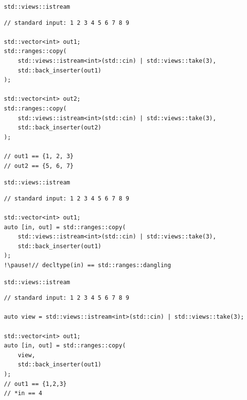 \documentclass[aspectratio=169]{beamer}
\begin{document}
\begin{frame}[fragile,c]{\texttt{std::views::istream}}
\small
\begin{center}
\begin{verbatim}
// standard input: 1 2 3 4 5 6 7 8 9

std::vector<int> out1;
std::ranges::copy(
    std::views::istream<int>(std::cin) | std::views::take(3),
    std::back_inserter(out1)
);

std::vector<int> out2;
std::ranges::copy(
    std::views::istream<int>(std::cin) | std::views::take(3),
    std::back_inserter(out2)
);

// out1 == {1, 2, 3}
// out2 == {5, 6, 7}
\end{verbatim}
\end{center}
\let\thefootnote\relax{}
\end{frame}

\begin{frame}[fragile,c]{\texttt{std::views::istream}}
\small
\begin{center}
\begin{verbatim}
// standard input: 1 2 3 4 5 6 7 8 9

std::vector<int> out1;
auto [in, out] = std::ranges::copy(
    std::views::istream<int>(std::cin) | std::views::take(3),
    std::back_inserter(out1)
);
!\pause!// decltype(in) == std::ranges::dangling
\end{verbatim}
\end{center}
\let\thefootnote\relax{}
\end{frame}

\begin{frame}[fragile,c]{\texttt{std::views::istream}}
\small
\begin{center}
\begin{verbatim}
// standard input: 1 2 3 4 5 6 7 8 9

auto view = std::views::istream<int>(std::cin) | std::views::take(3);

std::vector<int> out1;
auto [in, out] = std::ranges::copy(
    view,
    std::back_inserter(out1)
);
// out1 == {1,2,3}
// *in == 4
\end{verbatim}
\end{center}
\let\thefootnote\relax{}
\end{frame}
\end{document}
